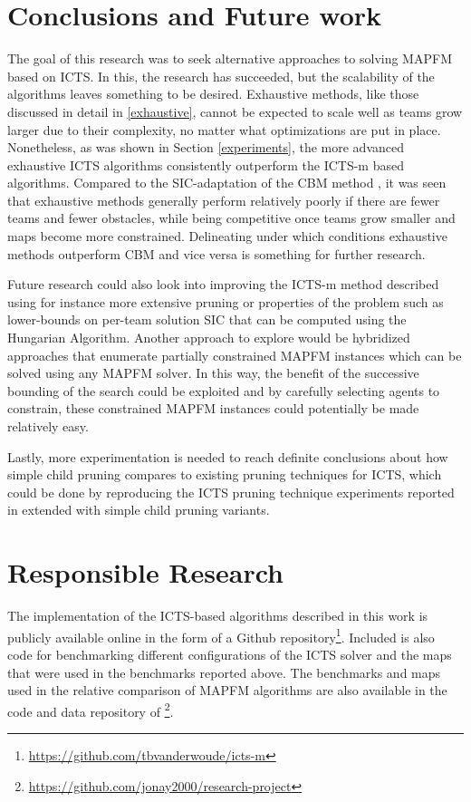 \documentclass[english]{article}
\begin{document}
	\section{Conclusions and Future work}
	\label{conclusions}
	\label{future}
	The goal of this research was to seek alternative approaches to solving MAPFM based on ICTS. In this, the research has succeeded, but the scalability of the algorithms leaves something to be desired. Exhaustive methods, like those discussed in detail in \ref{exhaustive}, cannot be expected to scale well as teams grow larger due to their complexity, no matter what optimizations are put in place. Nonetheless, as was shown in Section \ref{experiments}, the more advanced exhaustive ICTS algorithms consistently outperform the ICTS-m based algorithms. Compared to the SIC-adaptation of the CBM method \cite{baauw2021}, it was seen that exhaustive methods generally perform relatively poorly if there are fewer teams and fewer obstacles, while being competitive once teams grow smaller and maps become more constrained. Delineating under which conditions exhaustive methods outperform CBM and vice versa is something for further research.
	
	Future research could also look into improving the ICTS-m method described using for instance more extensive pruning or properties of the problem such as lower-bounds on per-team solution SIC that can be computed using the Hungarian Algorithm. Another approach to explore would be hybridized approaches that enumerate partially constrained MAPFM instances which can be solved using any MAPFM solver. In this way, the benefit of the successive bounding of the search could be exploited and by carefully selecting agents to constrain, these constrained MAPFM instances could potentially be made relatively easy.
	
	Lastly, more experimentation is needed to reach definite conclusions about how simple child pruning compares to existing pruning techniques for ICTS, which could be done by reproducing the ICTS pruning technique experiments reported in \cite{sharon2011} extended with simple child pruning variants. %
	
	\section{Responsible Research}
	The implementation of the ICTS-based algorithms described in this work is publicly available online in the form of a Github repository\footnote{\url{https://github.com/tbvanderwoude/icts-m}}. Included is also code for benchmarking different configurations of the ICTS solver and the maps that were used in the benchmarks reported above. The benchmarks and maps used in the relative comparison of MAPFM algorithms are also available in the code and data repository of \cite{donszelmann2021}\footnote{\url{https://github.com/jonay2000/research-project}}.
	
\end{document}

